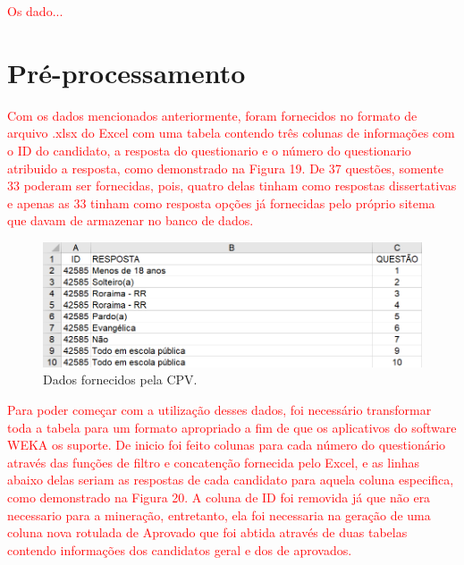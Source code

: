 \label{chapter:projeto}

\par
\textcolor{red}{Os dado...}

\section{Pré-processamento}

\par
\textcolor{red}{Com os dados mencionados anteriormente, foram fornecidos no formato de arquivo .xlsx do Excel com uma tabela contendo três colunas de informações com o ID do candidato, a resposta do questionario e o número do questionario atribuido a resposta, como demonstrado na Figura 19. De 37 questões, somente 33 poderam ser fornecidas, pois, quatro delas tinham como respostas dissertativas e apenas as 33 tinham como resposta opções já fornecidas pelo próprio sitema que davam de armazenar no banco de dados.}

\par
\begin{figure}[!htp]
	\begin{center}
    \caption{\label{fig:waveform_fig} Dados fornecidos pela CPV.}
	\includegraphics[scale=0.65]{Figuras/Formato_errado.png}
	\end{center}
\end{figure}

\par
\textcolor{red}{Para poder começar com a utilização desses dados, foi necessário transformar toda a tabela para um formato apropriado a fim de que os aplicativos do software WEKA os suporte. De inicio foi feito colunas para cada número do questionário através das funções de filtro e concatenção fornecida pelo Excel, e as linhas abaixo delas seriam as respostas de cada candidato para aquela coluna especifica, como demonstrado na Figura 20. A coluna de ID foi removida já que não era necessario para a mineração, entretanto, ela foi necessaria na geração de uma coluna nova rotulada de Aprovado que foi abtida através de duas tabelas contendo informações dos candidatos geral e dos de aprovados.}


